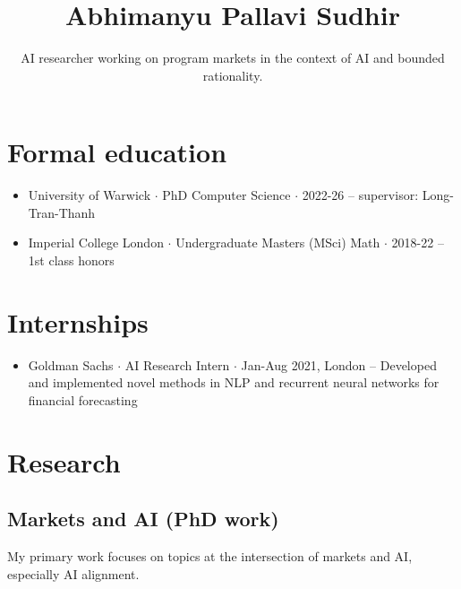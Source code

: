 \documentclass{article}
\title{\Large\bf Abhimanyu Pallavi Sudhir}
\subtitle{AI researcher working on program markets in the context of AI and bounded rationality. \\ %
\vspace{-2em}}
\begin{document}
\begingroup
\let\center\flushleft
\let\endcenter\endflushleft
\maketitle
\endgroup


\section*{Formal education}

\begin{itemize}

    \item University of Warwick $\cdot$ PhD Computer Science $\cdot$ 2022-26 -- supervisor: Long-Tran-Thanh %

    \item Imperial College London $\cdot$ Undergraduate Masters (MSci) Math $\cdot$ 2018-22 -- 1st class honors

\end{itemize}

\section*{Internships}

\begin{itemize}

    \item Goldman Sachs $\cdot$ AI Research Intern $\cdot$ Jan-Aug 2021, London -- Developed and implemented novel methods in NLP and recurrent neural networks for financial forecasting

\end{itemize}

\section*{Research}

\subsection*{Markets and AI (PhD work)}

My primary work focuses on topics at the intersection of markets and AI, especially AI alignment.
\end{document}
